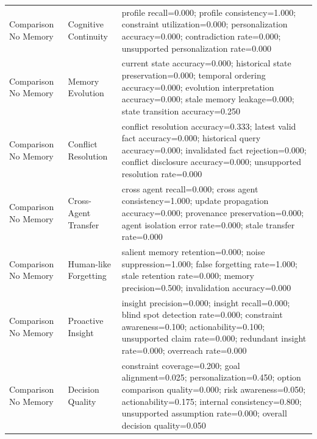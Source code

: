 \begin{longtable}{p{}p{}p{}}
Comparison No Memory & Cognitive Continuity & profile recall=0.000; profile consistency=1.000; constraint utilization=0.000; personalization accuracy=0.000; contradiction rate=0.000; unsupported personalization rate=0.000 \\
Comparison No Memory & Memory Evolution & current state accuracy=0.000; historical state preservation=0.000; temporal ordering accuracy=0.000; evolution interpretation accuracy=0.000; stale memory leakage=0.000; state transition accuracy=0.250 \\
Comparison No Memory & Conflict Resolution & conflict resolution accuracy=0.333; latest valid fact accuracy=0.000; historical query accuracy=0.000; invalidated fact rejection=0.000; conflict disclosure accuracy=0.000; unsupported resolution rate=0.000 \\
Comparison No Memory & Cross-Agent Transfer & cross agent recall=0.000; cross agent consistency=1.000; update propagation accuracy=0.000; provenance preservation=0.000; agent isolation error rate=0.000; stale transfer rate=0.000 \\
Comparison No Memory & Human-like Forgetting & salient memory retention=0.000; noise suppression=1.000; false forgetting rate=1.000; stale retention rate=0.000; memory precision=0.500; invalidation accuracy=0.000 \\
Comparison No Memory & Proactive Insight & insight precision=0.000; insight recall=0.000; blind spot detection rate=0.000; constraint awareness=0.100; actionability=0.100; unsupported claim rate=0.000; redundant insight rate=0.000; overreach rate=0.000 \\
Comparison No Memory & Decision Quality & constraint coverage=0.200; goal alignment=0.025; personalization=0.450; option comparison quality=0.000; risk awareness=0.050; actionability=0.175; internal consistency=0.800; unsupported assumption rate=0.000; overall decision quality=0.050 \\
\bottomrule
\end{longtable}
